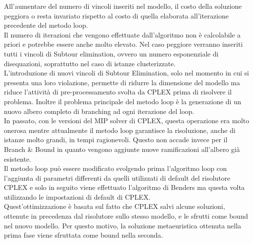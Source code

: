 All'aumentare del numero di vincoli inseriti nel modello, il costo della soluzione peggiora o resta invariato rispetto al costo di quella elaborata all'iterazione precedente del metodo loop.\\
Il numero di iterazioni che vengono effettuate dall'algoritmo non è calcolabile a priori e potrebbe essere anche molto elevato. Nel caso peggiore verranno inseriti tutti i vincoli di Subtour elimination, ovvero un numero esponenziale di disequazioni, soprattutto nel caso di istanze clusterizzate.\\
L'introduzione di nuovi vincoli di Subtour Elimination, solo nel momento in cui si presenta una loro violazione, permette di ridurre la dimensione del modello ma riduce l'attività di pre-processamento svolta da CPLEX prima di risolvere il problema.
Inoltre il problema principale del metodo loop è la generazione di un nuovo albero completo di branching ad ogni iterazione del loop.\\
In passato, con le versioni del MIP solver di CPLEX, questa operazione era molto onerosa mentre attualmente il metodo loop garantisce la risoluzione, anche di istanze molto grandi, in tempi ragionevoli.
Questo non accade invece per il Branch \& Bound in quanto vengono aggiunte nuove ramificazioni all'albero già esistente.\\
Il metodo loop può essere modificato svolgendo prima l'algoritmo loop con l'aggiunta di parametri differenti da quelli utilizzati di default del risolutore CPLEX e solo in seguito viene effettuato l'algoritmo di Benders ma questa volta utilizzando le impostazioni di default di CPLEX. \\
Quest'ottimizzazione è basata sul fatto che CPLEX salvi alcune soluzioni, ottenute in precedenza dal risolutore sullo stesso modello, e le sfrutti come bound nel nuovo modello. Per questo motivo, la soluzione metaeuristica ottenuta nella prima fase viene sfruttata come bound nella seconda.

